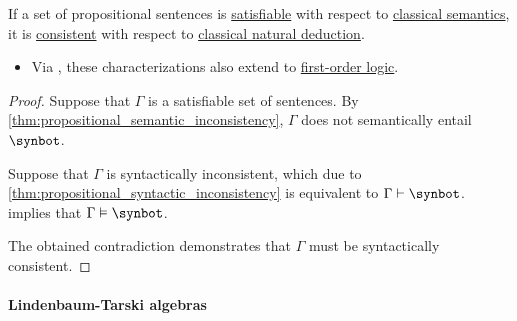 \begin{corollary}\label{thm:classical_propositional_satisfiable_implies_consistent}
  If a set of propositional sentences is \hyperref[def:propositional_semantics/satisfaction]{satisfiable} with respect to \hyperref[def:truth_value_algebra/classical]{classical semantics}, it is \hyperref[def:propositional_theory/consistent]{consistent} with respect to \hyperref[def:propositional_natural_deduction_system]{classical natural deduction}.
\end{corollary}
\begin{itemize}
  \item Via , these characterizations also extend to \hyperref[def:first_order_logic]{first-order logic}.
\end{itemize}
\begin{proof}
  Suppose that \( \Gamma \) is a satisfiable set of sentences. By \cref{thm:propositional_semantic_inconsistency}, \( \Gamma \) does not semantically entail \( \synbot \).

  Suppose that \( \Gamma \) is syntactically inconsistent, which due to \cref{thm:propositional_syntactic_inconsistency} is equivalent to \( \Gamma \vdash \synbot \).  implies that \( \Gamma \vDash \synbot \).

  The obtained contradiction demonstrates that \( \Gamma \) must be syntactically consistent.
\end{proof}

\paragraph{Lindenbaum-Tarski algebras}

